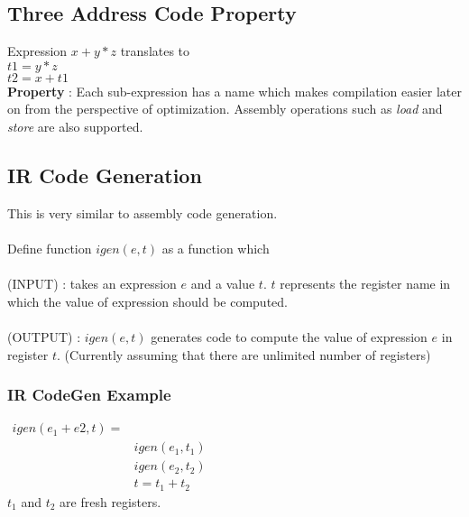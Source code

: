 \subsection{Three Address Code Property}
Expression $x+y*z$ translates to \\

$t1 = y*z$ \\

$t2 = x+t1$ \\

\textbf{Property} : Each sub-expression has a name which makes compilation easier later on from the perspective of optimization.
Assembly operations such as \emph{load} and \emph{store} are also supported.

\subsection{IR Code Generation}
This is very similar to assembly code generation. 
\\ \\
Define function \textbf{$igen(e,t)$} as a function which\\ \\
(INPUT) : takes an expression $e$ and a value $t$. $t$ represents the register name in which the value of expression should be computed.\\ \\
(OUTPUT) : $igen(e,t)$ generates code to compute the value of expression $e$ in register $t$. (Currently assuming that there are unlimited number of registers)

\subsubsection{IR CodeGen Example}
\begin{math}
\begin{array}{lcl}
    igen(e_1+e2,t) =  &  \\
     & igen(e_1, t_1) \\
     & igen(e_2, t_2)\\
     & t=t_1+t_2
\end{array}
\end{math}\\
$t_1$ and $t_2$ are fresh registers.

